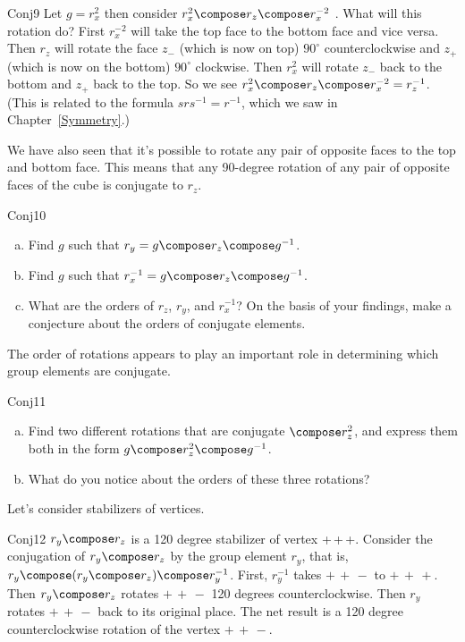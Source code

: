 \begin{example}{Conj9} 
Let  $g=r_x^2$ then consider $r_x^2\compose r_z\compose r_x^{-2}$ .   What will this rotation do? First $r_x^{-2}$ will take the top face to the bottom face and vice versa. Then $r_z$ will rotate the face $z_-$ (which is now on top)   $90^{\circ}$ counterclockwise and  $z_+$ (which is now on the bottom)  $90^{\circ}$ clockwise.  Then $r_x^2$ will rotate $z_-$ back to the bottom and $z_+$ back to the top.  So we see $r_x^2\compose r_z\compose r_x^{-2} = r_z^{-1}$. (This is related to the formula $s r s^{-1} = r^{-1}$, which we saw in Chapter~\ref{Symmetry}.)  
\end{example}

We have also seen that it's possible to rotate any pair of opposite faces to the top and bottom face. This means that any 90-degree rotation of any pair of opposite faces of the cube is conjugate to $r_z$.  

\begin{exercise}{Conj10}
\begin{enumerate} [(a)]
\item 
Find $g$ such that $r_y = g \compose r_z \compose g^{-1}$.
\item 
Find $g$ such that $r_x^{-1} = g \compose r_z \compose g^{-1}$.
\item What  are the orders of $r_z$, $r_y$, and $r_x^{-1}$? On the basis of your findings, make a conjecture about the orders of conjugate elements.
\end{enumerate}
\end{exercise}

The order of rotations appears to play an important role in determining which group elements are conjugate.

\begin{exercise}{Conj11}
\begin{enumerate}[(a)]
\item Find two different rotations that are conjugate $\compose r_z^2$, and express them both in the form 
$ g \compose r_z^2 \compose g^{-1}$.
\item What do you notice about the orders of these three rotations?
\end {enumerate}
\end{exercise}

 Let's consider stabilizers of vertices.

\begin{example}{Conj12}
 $r_y\compose r_z$ is a 120 degree stabilizer of vertex {+\,+\,+}.  Consider the conjugation of $r_y\compose r_z$ by the group element $r_y$, that is,  $r_y\compose (r_y\compose r_z)\compose r_y^{-1}$. First, $r_y^{-1}$ takes ${+\,+\,-}$ to ${+\,+\,+}$.  Then $r_y\compose r_z$ rotates ${+\,+\,-}$ 120 degrees counterclockwise. Then $r_y$ rotates ${+\,+\,-}$ back to its original place.  The net result is a 120 degree counterclockwise rotation of the vertex ${+\,+\,-}$.
\end{example}

